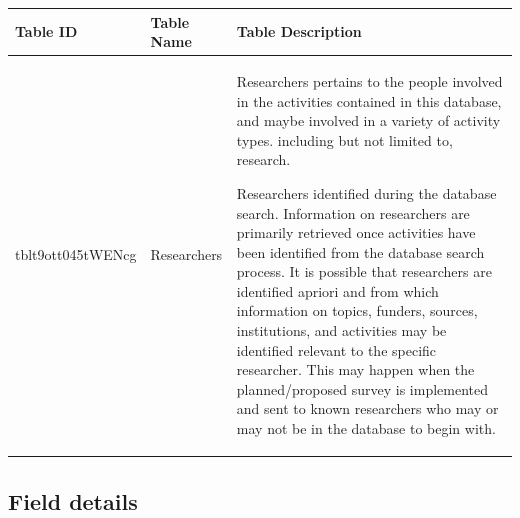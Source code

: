\documentclass[
]{book}
\begin{document}
\begin{table}
\centering
\begin{tabular}{l|l|l}
\hline
\textbf{Table ID} & \textbf{Table Name} & \textbf{Table Description}\\
\hline
tblt9ott045tWENcg & Researchers & Researchers pertains to the people involved in the activities contained in this database, and maybe involved in a variety of activity types. including but not limited to, research.

Researchers identified during the database search. Information on researchers are primarily retrieved once activities have been identified from the database search process. It is possible that researchers are identified apriori and from which information on topics, funders, sources, institutions, and activities may be identified relevant to the specific researcher. This may happen when the planned/proposed survey is implemented and sent to known researchers who may or may not be in the database to begin with.\\
\hline
\end{tabular}
\end{table}

\hypertarget{field-details-3}{%
\subsection{Field details}\label{field-details-3}}
\end{document}
